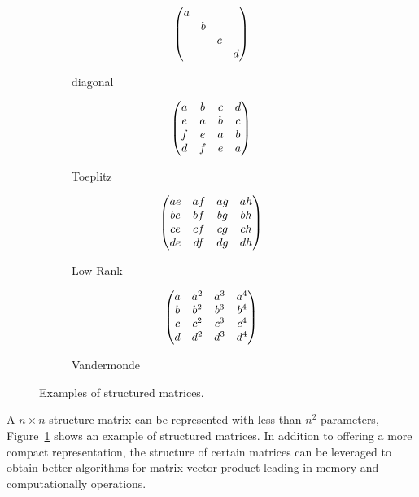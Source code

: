 \begin{figure}[ht]
   \centering
   \begin{subfigure}[t]{0.24\textwidth}
       \centering
       \begin{equation*}
	  \begin{pmatrix}
	    a &   &   &   \\
	      & b &   &   \\
	      &   & c &   \\
	      &   &   & d
	  \end{pmatrix}
       \end{equation*}
       \caption*{diagonal}
   \end{subfigure}
   \hfill
   \begin{subfigure}[t]{0.24\textwidth}
       \centering
       \begin{equation*}
	  \begin{pmatrix}
	    a & b & c & d \\
	    e & a & b & c \\
	    f & e & a & b \\
	    d & f & e & a
	  \end{pmatrix}
       \end{equation*}
       \caption*{Toeplitz}
   \end{subfigure}
   \hfill
   \begin{subfigure}[t]{0.24\textwidth}
       \centering
       \begin{equation*}
	  \begin{pmatrix}
	    ae & af & ag & ah \\
	    be & bf & bg & bh \\
	    ce & cf & cg & ch \\
	    de & df & dg & dh
	  \end{pmatrix}
       \end{equation*}
       \caption*{Low Rank}
   \end{subfigure}
   \hfill
   \begin{subfigure}[t]{0.24\textwidth}
       \centering
       \begin{equation*}
	  \begin{pmatrix}
	    a & a^2 & a^3 & a^4 \\
	    b & b^2 & b^3 & b^4 \\
	    c & c^2 & c^3 & c^4 \\
	    d & d^2 & d^3 & d^4
	  \end{pmatrix}
       \end{equation*}
       \caption*{Vandermonde}
   \end{subfigure}
  \caption{Examples of structured matrices.}
  \label{figure:example_structure_matrices}
\end{figure}


A $n \times n$ structure matrix can be represented with less than $n^2$ parameters, Figure~\ref{figure:example_structure_matrices} shows an example of structured matrices.
In addition to offering a more compact representation, the structure of certain matrices can be leveraged to obtain better algorithms for matrix-vector product leading in memory and computationally operations. 

